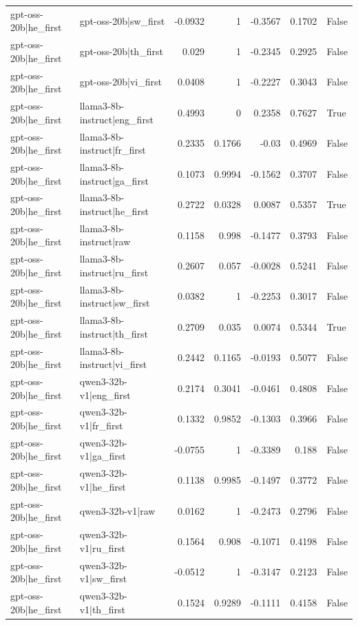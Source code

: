 \begin{table}
\begin{tabular}{l l r r r r l}
gpt-oss-20b|he_first & gpt-oss-20b|sw_first & -0.0932 & 1 & -0.3567 & 0.1702 & False \\
gpt-oss-20b|he_first & gpt-oss-20b|th_first & 0.029 & 1 & -0.2345 & 0.2925 & False \\
gpt-oss-20b|he_first & gpt-oss-20b|vi_first & 0.0408 & 1 & -0.2227 & 0.3043 & False \\
gpt-oss-20b|he_first & llama3-8b-instruct|eng_first & 0.4993 & 0 & 0.2358 & 0.7627 & True \\
gpt-oss-20b|he_first & llama3-8b-instruct|fr_first & 0.2335 & 0.1766 & -0.03 & 0.4969 & False \\
gpt-oss-20b|he_first & llama3-8b-instruct|ga_first & 0.1073 & 0.9994 & -0.1562 & 0.3707 & False \\
gpt-oss-20b|he_first & llama3-8b-instruct|he_first & 0.2722 & 0.0328 & 0.0087 & 0.5357 & True \\
gpt-oss-20b|he_first & llama3-8b-instruct|raw & 0.1158 & 0.998 & -0.1477 & 0.3793 & False \\
gpt-oss-20b|he_first & llama3-8b-instruct|ru_first & 0.2607 & 0.057 & -0.0028 & 0.5241 & False \\
gpt-oss-20b|he_first & llama3-8b-instruct|sw_first & 0.0382 & 1 & -0.2253 & 0.3017 & False \\
gpt-oss-20b|he_first & llama3-8b-instruct|th_first & 0.2709 & 0.035 & 0.0074 & 0.5344 & True \\
gpt-oss-20b|he_first & llama3-8b-instruct|vi_first & 0.2442 & 0.1165 & -0.0193 & 0.5077 & False \\
gpt-oss-20b|he_first & qwen3-32b-v1|eng_first & 0.2174 & 0.3041 & -0.0461 & 0.4808 & False \\
gpt-oss-20b|he_first & qwen3-32b-v1|fr_first & 0.1332 & 0.9852 & -0.1303 & 0.3966 & False \\
gpt-oss-20b|he_first & qwen3-32b-v1|ga_first & -0.0755 & 1 & -0.3389 & 0.188 & False \\
gpt-oss-20b|he_first & qwen3-32b-v1|he_first & 0.1138 & 0.9985 & -0.1497 & 0.3772 & False \\
gpt-oss-20b|he_first & qwen3-32b-v1|raw & 0.0162 & 1 & -0.2473 & 0.2796 & False \\
gpt-oss-20b|he_first & qwen3-32b-v1|ru_first & 0.1564 & 0.908 & -0.1071 & 0.4198 & False \\
gpt-oss-20b|he_first & qwen3-32b-v1|sw_first & -0.0512 & 1 & -0.3147 & 0.2123 & False \\
gpt-oss-20b|he_first & qwen3-32b-v1|th_first & 0.1524 & 0.9289 & -0.1111 & 0.4158 & False \\

\end{tabular}
\end{table}
